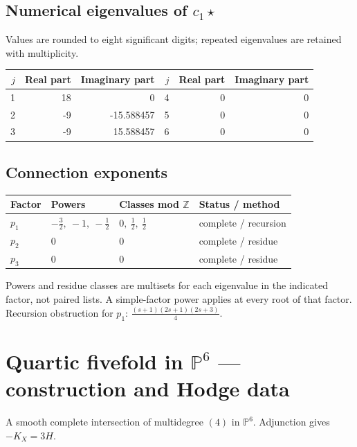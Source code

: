 \documentclass[10pt,a4paper]{article}
\begin{document}
\subsection*{Numerical eigenvalues of $c_1\star$}
Values are rounded to eight significant digits; repeated eigenvalues are retained with multiplicity.
\begin{center}\small\begin{tabular}{rrr@{\qquad}rrr}\toprule $j$ & Real part & Imaginary part & $j$ & Real part & Imaginary part\\\midrule
1 & 18 & 0 & 4 & 0 & 0\\
2 & -9 & -15.588457 & 5 & 0 & 0\\
3 & -9 & 15.588457 & 6 & 0 & 0\\
\bottomrule\end{tabular}\end{center}
\subsection*{Connection exponents}
\begin{center}\begin{tabular}{llll}\toprule Factor & Powers & Classes mod $\mathbb Z$ & Status / method\\\midrule
$p_{1}$ & $- \frac{3}{2},\ -1,\ - \frac{1}{2}$ & $0,\ \frac{1}{2},\ \frac{1}{2}$ & complete / recursion\\
$p_{2}$ & $0$ & $0$ & complete / residue\\
$p_{3}$ & $0$ & $0$ & complete / residue\\
\bottomrule\end{tabular}\end{center}
Powers and residue classes are multisets for each eigenvalue in the indicated factor, not paired lists. A simple-factor power applies at every root of that factor.
Recursion obstruction for $p_{1}$: $\frac{\left(s + 1\right) \left(2 s + 1\right) \left(2 s + 3\right)}{4}$.
\clearpage\section*{Quartic fivefold in $\mathbb P^{6}$ --- construction and Hodge data}\label{entry:PCI5-4}
A smooth complete intersection of multidegree $(4)$ in $\mathbb P^{6}$.
Adjunction gives $-K_X=3H$.
\end{document}

